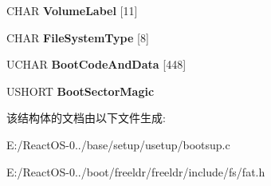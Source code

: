 \begin{DoxyCompactItemize}
\item 
\mbox{\label{struct___f_a_t___b_o_o_t_s_e_c_t_o_r_a5b515505453a70c766948c7224a84591}} 
C\+H\+AR {\bfseries Volume\+Label} \mbox{[}11\mbox{]}
\item 
\mbox{\label{struct___f_a_t___b_o_o_t_s_e_c_t_o_r_a9c74d144c03e4b61907ba9562ec34da7}} 
C\+H\+AR {\bfseries File\+System\+Type} \mbox{[}8\mbox{]}
\item 
\mbox{\label{struct___f_a_t___b_o_o_t_s_e_c_t_o_r_ad91b3dcda2a5fb05ec54317f609f40dc}} 
U\+C\+H\+AR {\bfseries Boot\+Code\+And\+Data} \mbox{[}448\mbox{]}
\item 
\mbox{\label{struct___f_a_t___b_o_o_t_s_e_c_t_o_r_ac40fc2b9f738b7d22eef6c85701d3e55}} 
U\+S\+H\+O\+RT {\bfseries Boot\+Sector\+Magic}
\end{DoxyCompactItemize}


该结构体的文档由以下文件生成\+:\begin{DoxyCompactItemize}
\item 
E\+:/\+React\+O\+S-\/0../base/setup/usetup/bootsup.\+c\item 
E\+:/\+React\+O\+S-\/0../boot/freeldr/freeldr/include/fs/fat.\+h\end{DoxyCompactItemize}

